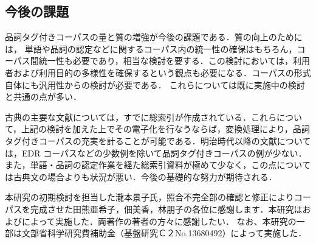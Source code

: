 \subsection{今後の課題}
\label{sec:Future}

品詞タグ付きコーパスの量と質の増強が今後の課題である．質の向上のためには，
単語や品詞の認定などに関するコーパス内の統一性の確保はもちろん，コーパス間統一性も必要であり，相当な検討を要する．この検討においては，利用者および利用目的の多様性を確保するという観点も必要になる．コーパスの形式自体にも汎用性からの検討が必要である．
これらについては既に実施中の検討と共通の点が多い\cite{Tanaka2000}\cite{Hashida1999}．

古典の主要な文献については，すでに総索引が作成されている．これらについて，上記の検討を加えた上でその電子化を行なうならば，変換処理により，品詞タグ付きコーパスの充実を計ることが可能である．明治時代以降の文献については，EDR コーパスなどの少数例を除いて品詞タグ付きコーパスの例が少ない．また，単語・品詞の認定作業を経た総索引資料が極めて少なく，この点については古典文の場合よりも状況が悪い．今後の基礎的な努力が期待される．

\acknowledgment

本研究の初期検討を担当した瀧本景子氏，照合不完全部の確認と修正によりコーパスを完成させた田熊亜希子，佃美香，林朋子の各位に感謝します．本研究は\cite{UTA1994}および\cite{NIKKI1996}によって実施した．両著作の著者の方々に感謝したい．
なお、本研究の一部は文部省科学研究費補助金（基盤研究Ｃ２No.13680492）によって実施した．
 





\begin{biography}



\end{biography}



